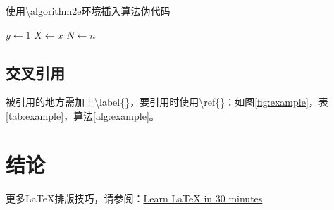 \documentclass[hyperref,a4paper,UTF8]{ctexart}
\begin{document}
使用\textbackslash algorithm2e环境插入算法伪代码


{}

\begin{algorithm}[h]
\caption{An algorithm with caption}\label{alg:example}
$y \gets 1$\;
$X \gets x$\;
$N \gets n$\;
\end{algorithm}


\subsection{交叉引用}
被引用的地方需加上\textbackslash label\{\}，要引用时使用\textbackslash ref\{\}：如图\ref{fig:example}，表\ref{tab:example}，算法\ref{alg:example}。


\section{结论}

更多\LaTeX 排版技巧，请参阅：\href{https://www.overleaf.com/learn/latex/Learn_LaTeX_in_30_minutes}{Learn LaTeX in 30 minutes}



\newpage


\end{document}
